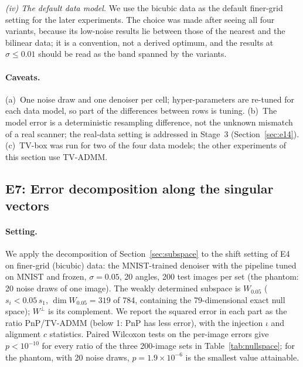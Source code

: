 \emph{(iv) The default data model.} We use the bicubic data as the default finer-grid setting for the later experiments. The choice was made after seeing all four variants, because its low-noise results lie between those of the nearest and the bilinear data; it is a convention, not a derived optimum, and the results at $\sigma\le0.01$ should be read as the band spanned by the variants.

\paragraph{Caveats.}
(a)~One noise draw and one denoiser per cell; hyper-parameters are re-tuned for each data model, so part of the differences between rows is tuning. (b)~The model error is a deterministic resampling difference, not the unknown mismatch of a real scanner; the real-data setting is addressed in Stage~3 (Section~\ref{sec:e14}).
(c)~TV-box was run for two of the four data models; the other experiments of this section use TV-ADMM.


\subsection{E7: Error decomposition along the singular vectors}\label{sec:nullspace-results}
\paragraph{Setting.}
We apply the decomposition of Section~\ref{sec:subspace} to the shift setting of E4 on finer-grid (bicubic) data: the MNIST-trained denoiser with the pipeline tuned on MNIST and frozen, $\sigma=0.05$, 20 angles, 200 test images per set (the phantom: 20 noise draws of one image).
The weakly determined subspace is $W_{0.05}$ ($s_i<0.05\,s_1$, $\dim W_{0.05}=319$ of 784, containing the 79-dimensional exact null space); $W^\perp$ is its complement. We report the squared error in each part as the ratio PnP/TV-ADMM (below 1: PnP has less error),
with the injection $\iota$ and alignment $c$ statistics. Paired Wilcoxon tests on the per-image errors give $p<10^{-10}$ for every ratio of the three 200-image sets in Table~\ref{tab:nullspace}; for the phantom, with 20 noise draws, $p=1.9\times10^{-6}$ is the smallest value attainable.

